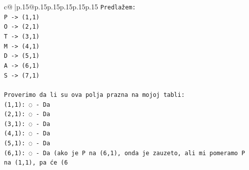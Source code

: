 \documentclass{article}
\begin{document}
{\begin{supertabular}{c@{$\;$}|p{.15\linewidth}@{}p{.15\linewidth}p{.15\linewidth}p{.15\linewidth}p{.15\linewidth}p{.15\linewidth}}
{{{\texttt{Predlažem:} \\
\texttt{P {-}> (1,1)} \\
\texttt{O {-}> (2,1)} \\
\texttt{T {-}> (3,1)} \\
\texttt{M {-}> (4,1)} \\
\texttt{D {-}> (5,1)} \\
\texttt{A {-}> (6,1)} \\
\texttt{S {-}> (7,1)} \\
\\ 
\texttt{Proverimo da li su ova polja prazna na mojoj tabli:} \\
\texttt{(1,1): ◌ {-} Da} \\
\texttt{(2,1): ◌ {-} Da} \\
\texttt{(3,1): ◌ {-} Da} \\
\texttt{(4,1): ◌ {-} Da} \\
\texttt{(5,1): ◌ {-} Da} \\
\texttt{(6,1): ◌ {-} Da (ako je P na (6,1), onda je zauzeto, ali mi pomeramo P na (1,1), pa će (6} \\
            }
        }
    }
     \\ \\


\end{supertabular}}
\end{document}
